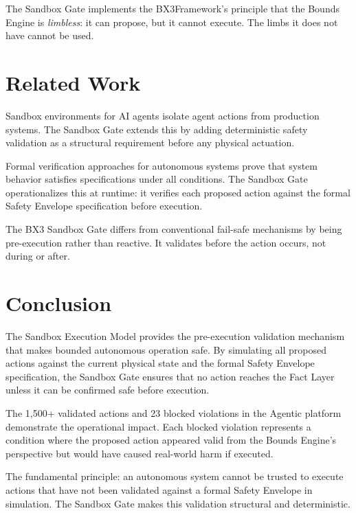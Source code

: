\documentclass[12pt]{article}
\newcommand{\bxthree}{BX3}
\begin{document}
The Sandbox Gate implements the \bxthree Framework's principle that the Bounds Engine is \textit{limbless}: it can propose, but it cannot execute. The limbs it does not have cannot be used.

\section{Related Work}
\label{sec:prior}

Sandbox environments for AI agents \cite{browser2024sandbox} isolate agent actions from production systems. The Sandbox Gate extends this by adding deterministic safety validation as a structural requirement before any physical actuation.

Formal verification approaches for autonomous systems \cite{rashie2026} prove that system behavior satisfies specifications under all conditions. The Sandbox Gate operationalizes this at runtime: it verifies each proposed action against the formal Safety Envelope specification before execution.

The BX3 Sandbox Gate differs from conventional fail-safe mechanisms by being pre-execution rather than reactive. It validates before the action occurs, not during or after.

\section{Conclusion}
\label{sec:conclusion}

The Sandbox Execution Model provides the pre-execution validation mechanism that makes bounded autonomous operation safe. By simulating all proposed actions against the current physical state and the formal Safety Envelope specification, the Sandbox Gate ensures that no action reaches the Fact Layer unless it can be confirmed safe before execution.

The 1,500+ validated actions and 23 blocked violations in the Agentic platform demonstrate the operational impact. Each blocked violation represents a condition where the proposed action appeared valid from the Bounds Engine's perspective but would have caused real-world harm if executed.

The fundamental principle: an autonomous system cannot be trusted to execute actions that have not been validated against a formal Safety Envelope in simulation. The Sandbox Gate makes this validation structural and deterministic.



\end{document}
